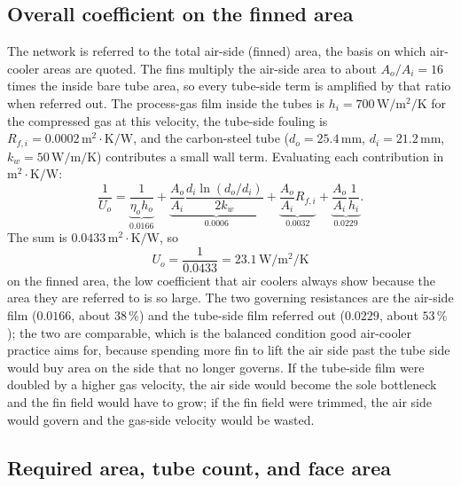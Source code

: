 \subsection{Overall coefficient on the finned area}

The network is referred to the total air-side (finned) area, the basis on which
air-cooler areas are quoted. The fins multiply the air-side area to about
$A_o/A_i = 16$ times the inside bare tube area, so every tube-side term is
amplified by that ratio when referred out. The process-gas film inside the tubes
is $h_i = 700\,\si{\watt\per\meter\squared\per\kelvin}$ for the compressed gas at
this velocity, the tube-side fouling is $R_{f,i} = 0.0002\,\text{m}^2\cdot\si{
\kelvin}/\text{W}$, and the carbon-steel tube ($d_o = 25.4\,\si{\milli\meter}$,
$d_i = 21.2\,\si{\milli\meter}$, $k_w = 50\,\si{\watt\per\meter\per\kelvin}$)
contributes a small wall term. Evaluating each contribution in
$\text{m}^2\cdot\si{\kelvin}/\text{W}$:
\[
\frac{1}{U_o} = \underbrace{\frac{1}{\eta_o h_o}}_{0.0166}
+ \underbrace{\frac{A_o}{A_i}\frac{d_i\ln(d_o/d_i)}{2k_w}}_{0.0006}
+ \underbrace{\frac{A_o}{A_i}R_{f,i}}_{0.0032}
+ \underbrace{\frac{A_o}{A_i}\frac{1}{h_i}}_{0.0229}.
\]
The sum is $0.0433\,\text{m}^2\cdot\si{\kelvin}/\text{W}$, so
\[
U_o = \frac{1}{0.0433} = 23.1\,\si{\watt\per\meter\squared\per\kelvin}
\]
on the finned area, the low coefficient that air coolers always show because the
area they are referred to is so large. The two governing resistances are the
air-side film ($0.0166$, about $38\,\%$) and the tube-side film referred out
($0.0229$, about $53\,\%$); the two are comparable, which is the balanced
condition good air-cooler practice aims for, because spending more fin to lift the
air side past the tube side would buy area on the side that no longer governs. If
the tube-side film were doubled by a higher gas velocity, the air side would
become the sole bottleneck and the fin field would have to grow; if the fin field
were trimmed, the air side would govern and the gas-side velocity would be wasted.

\subsection{Required area, tube count, and face area}

